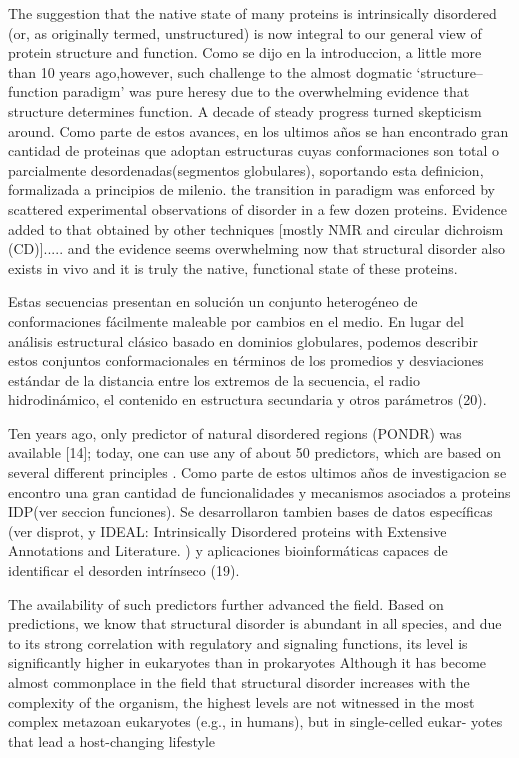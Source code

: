 The suggestion that the native state of many proteins is intrinsically disordered (or, as originally termed, unstructured) is now integral to our general view of protein structure and function.
Como se dijo en la introduccion, a little more than 10 years ago,however, such challenge to the almost dogmatic ‘structure–function paradigm’ was pure heresy due to the overwhelming evidence that structure determines function.
A decade of steady progress turned skepticism around.
Como parte de estos avances, en los ultimos años se han encontrado gran cantidad de proteinas que adoptan estructuras cuyas conformaciones son total o parcialmente desordenadas(segmentos globulares), soportando esta definicion, formalizada a principios de milenio. 
the transition in paradigm was enforced by scattered experimental observations of disorder in a few dozen proteins. 
Evidence added to that obtained by other techniques [mostly NMR and circular dichroism (CD)]..... and the evidence seems overwhelming now that structural disorder also exists in vivo and it is truly the native, functional state of these proteins.


Estas secuencias presentan en solución un conjunto heterogéneo de conformaciones fácilmente maleable por cambios en el medio. 
En lugar del análisis estructural clásico basado en dominios globulares, podemos describir estos conjuntos conformacionales en términos de los promedios y desviaciones estándar de la distancia entre los extremos de la secuencia, el radio hidrodinámico, el contenido en estructura secundaria y otros parámetros (20).

Ten years ago, only predictor of natural disordered regions (PONDR) was available [14]; today, one can use any of about 50 predictors, which are based on several different principles \cite{he2009predicting}.
Como parte de estos ultimos años de investigacion se encontro una gran cantidad de funcionalidades y mecanismos asociados a proteins IDP(ver seccion funciones).
Se desarrollaron tambien bases de datos específicas (ver disprot, y IDEAL: Intrinsically Disordered proteins with Extensive Annotations and Literature. ) y aplicaciones bioinformáticas capaces de identificar el desorden intrínseco (19).

The availability of such predictors further advanced the field.
Based on predictions, we know that structural disorder is abundant in all species, and due to its strong correlation with regulatory and signaling functions, its level is significantly higher in eukaryotes than in prokaryotes
Although it has become almost commonplace in the field that structural disorder increases with the complexity of the organism, the highest levels are not witnessed in the most complex metazoan eukaryotes (e.g., in humans), but in single-celled eukar-
yotes that lead a host-changing lifestyle

